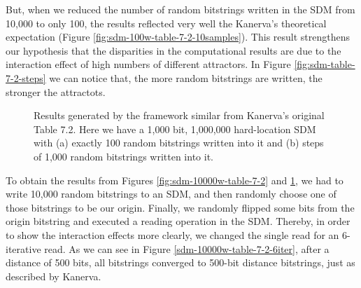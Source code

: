 But, when we reduced the number of random bitstrings written in the SDM from 10,000 to only 100, the results reflected very well the Kanerva's theoretical expectation (Figure \ref{fig:sdm-100w-table-7-2-10samples}). This result strengthens our hypothesis that the disparities in the computational results are due to the interaction effect of high numbers of different attractors. In Figure \ref{fig:sdm-table-7-2-steps} we can notice that, the more random bitstrings are written, the stronger the attractots.

\begin{figure}[h]
\centering
{}

\caption{Results generated by the framework similar from Kanerva's original Table 7.2. Here we have a 1,000 bit, 1,000,000 hard-location SDM with (a) exactly 100 random bitstrings written into it and (b) steps of 1,000 random bitstrings written into it.
\label{fig:sdm-100w-table-7-2}}
\end{figure}

To obtain the results from Figures \ref{fig:sdm-10000w-table-7-2} and \ref{fig:sdm-100w-table-7-2}, we had to write 10,000 random bitstrings to an SDM, and then randomly choose one of those bitstrings to be our origin. Finally, we randomly flipped some bits from the origin bitstring and executed a reading operation in the SDM. Thereby, in order to show the interaction effects more clearly, we changed the single read for an 6-iterative read. As we can see in Figure \ref{sdm-10000w-table-7-2-6iter}, after a distance of 500 bits, all bitstrings converged to 500-bit distance bitstrings, just as described by Kanerva.

